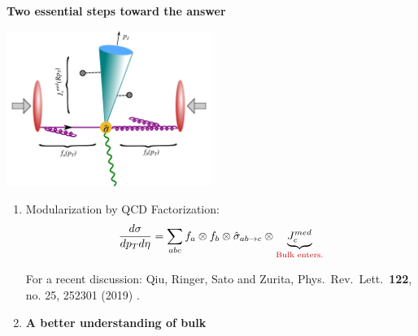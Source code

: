 \documentclass[9pt,a4paper,unknownkeysallowed,xcolor=dvipsnames,aspectratio=43]{beamer}
\begin{document}
%
%
\begin{frame}{\bf\huge Two essential steps toward the answer}	\vspace{4mm}
\begin{center}
\includegraphics[width=0.5\textwidth]{fig/facotrization}\\
\end{center}
\begin{enumerate}
\item{Modularization by QCD Factorization:}
\begin{align}
    \frac{d\sigma}{dp_{T} d\eta} =\sum\limits_{abc}f_a\otimes f_b \otimes \hat{\sigma}_{ab\to c}\otimes \underbrace{J_c^{med}}_{\text{\color{darkred}Bulk enters.}}\notag
\end{align}
\begin{center}
{\tiny  For a recent discussion: {\color{teablue}
  Qiu, Ringer, Sato and Zurita,
  Phys.\ Rev.\ Lett.\  {\bf 122}, no. 25, 252301 (2019)
  .
  }}
\end{center}
  \vspace{1mm}
\item{\color{darkred}\bf A better understanding of bulk
 }
\end{enumerate}
\end{frame}
\end{document}

